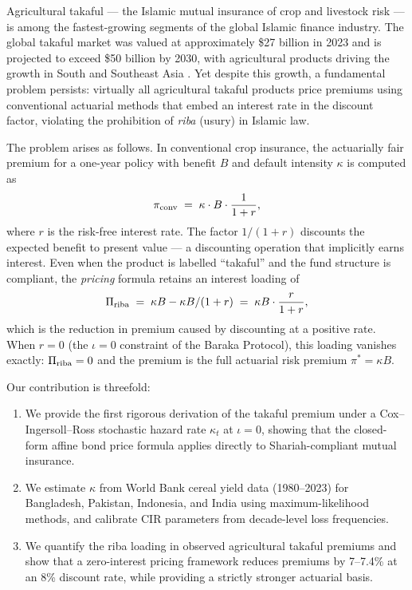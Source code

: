 \documentclass[12pt,a4paper]{article}
\begin{document}
Agricultural takaful — the Islamic mutual insurance of crop and livestock risk — is
among the fastest-growing segments of the global Islamic finance industry.
The global takaful market was valued at approximately \$27 billion in 2023 and is
projected to exceed \$50 billion by 2030, with agricultural products driving the
growth in South and Southeast Asia \citep{IFSB2024}.
Yet despite this growth, a fundamental problem persists: virtually all agricultural
takaful products price premiums using conventional actuarial methods that embed an
interest rate in the discount factor, violating the prohibition of \textit{riba}
(usury) in Islamic law.

The problem arises as follows.
In conventional crop insurance, the actuarially fair premium for a one-year policy
with benefit $B$ and default intensity $\kappa$ is computed as
\begin{equation}
  \pi_{\rm conv} \;=\; \kappa \cdot B \cdot \frac{1}{1+r},
  \label{eq:conv_premium}
\end{equation}
where $r$ is the risk-free interest rate.
The factor $1/(1+r)$ discounts the expected benefit to present value — a discounting
operation that implicitly earns interest.
Even when the product is labelled ``takaful'' and the fund structure is compliant,
the \emph{pricing} formula retains an interest loading of
\begin{equation}
  \Pi_{\rm riba} \;=\; \kappa B - \kappa B/(1+r) \;=\; \kappa B \cdot \frac{r}{1+r},
  \label{eq:riba_loading}
\end{equation}
which is the reduction in premium caused by discounting at a positive rate.
When $r=0$ (the $\iota=0$ constraint of the Baraka Protocol), this loading vanishes
exactly: $\Pi_{\rm riba}=0$ and the premium is the full actuarial risk premium
$\pi^*=\kappa B$.

Our contribution is threefold:
\begin{enumerate}
  \item We provide the first rigorous derivation of the takaful premium under a
    Cox--Ingersoll--Ross stochastic hazard rate $\kappa_t$ at $\iota=0$, showing
    that the closed-form affine bond price formula applies directly to
    Shariah-compliant mutual insurance.
  \item We estimate $\kappa$ from World Bank cereal yield data (1980--2023) for
    Bangladesh, Pakistan, Indonesia, and India using maximum-likelihood methods,
    and calibrate CIR parameters from decade-level loss frequencies.
  \item We quantify the riba loading in observed agricultural takaful premiums and
    show that a zero-interest pricing framework reduces premiums by 7--7.4\% at
    an 8\% discount rate, while providing a strictly stronger actuarial basis.
\end{enumerate}
\end{document}
